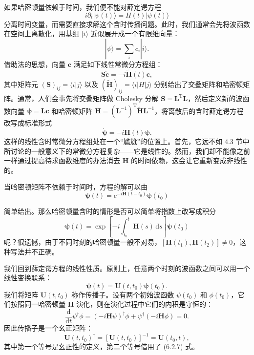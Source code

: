 如果哈密顿量依赖于时间，我们便不能对薛定谔方程
\begin{equation}
 i\partial_t|\psi(t)\rangle=H(t)|\psi(t)\rangle
\tag{6.2.1}
\end{equation}
分离时间变量，而需要直接求解这个含时传播问题。此时，我们通常会先将波函数在空间上离散化，用基组 $|i\rangle$ 近似展开成一个有限维向量：
\begin{equation}
 |\psi\rangle=\sum_i c_i|i\rangle.
\tag{6.2.2}
\end{equation}
借助法的思想，向量 $\bm c$ 满足如下线性常微分方程组：
\begin{equation}
 \mathbf S\dot{\bm c}=-i\widetilde{\mathbf H}(t)\bm c,
\tag{6.2.3}
\end{equation}
其中矩阵元 $(\mathbf S)_{ij}=\langle i|j\rangle$ 以及 $(\widetilde{\mathbf H})_{ij}=\langle i|H|j\rangle$ 分别给出了交叠矩阵和哈密顿矩阵。通常，人们会事先将交叠矩阵做 Cholesky 分解 $\mathbf S=\mathbf L^\mathrm T\mathbf L$，然后定义新的波函数向量 $\bm\psi=\mathbf L\bm c$ 和哈密顿矩阵 $\mathbf H=(\mathbf L^{-1})^\mathrm T\widetilde{\mathbf H}\mathbf L^{-1}$，将离散后的含时薛定谔方程改写成标准形式
\begin{equation}
 \dot{\bm\psi}=-i\mathbf H(t)\bm\psi.
\tag{6.2.4}
\end{equation}
这样的线性含时常微分方程组处在一个“尴尬”的位置上。首先，它远不如 4.3 节中所讨论的一般意义下的常微分方程复杂——它是线性的。然而，我们却不能像之前一样通过提高待求函数维度的办法消去 $\mathbf H$ 的时间依赖，这会让它重新变成非线性的。

当哈密顿矩阵不依赖于时间时，方程的解可以由
\begin{equation}
 \bm\psi(t)=e^{-i\mathbf H(t-t_0)}\bm\psi(t_0)
\tag{6.2.5}
\end{equation}

简单给出。那么哈密顿量含时的情形是否可以简单将指数上改写成积分
\begin{equation}
 \bm\psi(t)=\exp\left[-i\int_{t_0}^t\mathbf H(s)\,\mathrm ds\right]\bm\psi(t_0)
\tag{6.2.6}
\end{equation}
呢？很遗憾，由于不同时刻的哈密顿量一般不对易，$[\mathbf H(t_1),\mathbf H(t_2)]\ne0$，这种写法并不正确。

我们回到薛定谔方程的线性性质。原则上，任意两个时刻的波函数之间可以用一个线性变换联系：
\begin{equation}
 \bm\psi(t)=\mathbf U(t,t_0)\bm\psi(t_0).
\tag{6.2.7}
\end{equation}
我们将矩阵 $\mathbf U(t,t_0)$ 称作传播子。设有两个初始波函数 $\psi(t_0)$ 和 $\phi(t_0)$，它们按照同一哈密顿量 $\mathbf H$ 演化，则在演化过程中它们的内积是守恒的：
\begin{equation}
 \frac{\mathrm d}{\mathrm dt}\psi^\dagger\phi=(-i\mathbf H\psi)^\dagger\phi+\psi^\dagger(-i\mathbf H\phi)=0.
\tag{6.2.8}
\end{equation}
因此传播子是一个幺正矩阵：
\begin{equation}
 \mathbf U(t,t_0)^\dagger=[\mathbf U(t,t_0)]^{-1}=\mathbf U(t_0,t),
\tag{6.2.9}
\end{equation}
其中第一个等号是幺正性的定义，第二个等号借用了 (6.2.7) 式。

